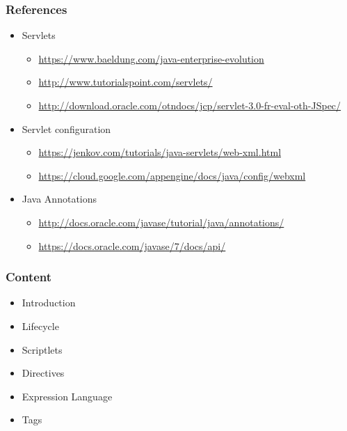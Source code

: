 \documentclass[10pt,xcolor=pdflatex]{beamer}
\begin{document}
\begin{frame}\frametitle{References}
	\begin{itemize}
    	\item Servlets
          \begin{itemize}
            \item \url{https://www.baeldung.com/java-enterprise-evolution}
        	\item \url{http://www.tutorialspoint.com/servlets/}
            \item \url{http://download.oracle.com/otndocs/jcp/servlet-3.0-fr-eval-oth-JSpec/}
          \end{itemize}
        \item Servlet configuration
          \begin{itemize}
            \item \url{https://jenkov.com/tutorials/java-servlets/web-xml.html}
            \item \url{https://cloud.google.com/appengine/docs/java/config/webxml}
          \end{itemize}
        \item{Java Annotations}
		  \begin{itemize}
        	\item \url{http://docs.oracle.com/javase/tutorial/java/annotations/}
            \item \url{https://docs.oracle.com/javase/7/docs/api/}
          \end{itemize}
    \end{itemize}
\end{frame}



\begin{frame}\frametitle{Content}
	\begin{itemize}
    	\item Introduction
		\item Lifecycle
		\item Scriptlets
		\item Directives
		\item Expression Language
		\item Tags
    \end{itemize}
\end{frame}
\end{document}
